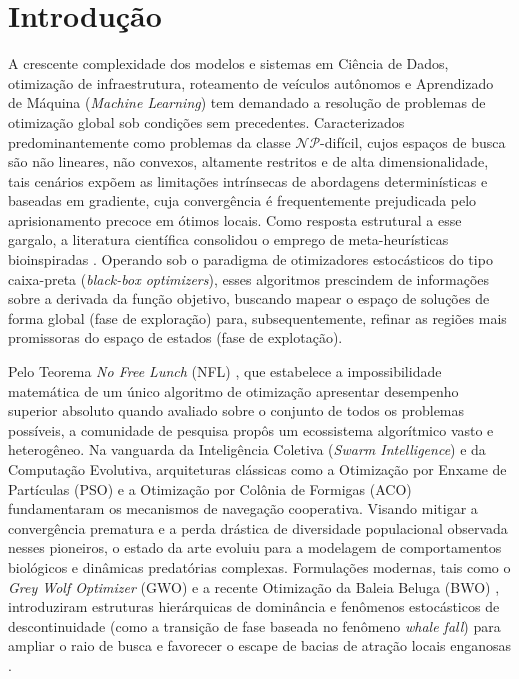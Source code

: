 \documentclass[12pt, a4paper, oneside]{report}
\begin{document}
\tableofcontents
\clearpage


\chapter{Introdução}
A crescente complexidade dos modelos e sistemas em Ciência de Dados, otimização de infraestrutura, roteamento de veículos autônomos e Aprendizado de Máquina (\textit{Machine Learning}) tem demandado a resolução de problemas de otimização global sob condições sem precedentes. Caracterizados predominantemente como problemas da classe $\mathcal{NP}$-difícil, cujos espaços de busca são não lineares, não convexos, altamente restritos e de alta dimensionalidade, tais cenários expõem as limitações intrínsecas de abordagens determinísticas e baseadas em gradiente, cuja convergência é frequentemente prejudicada pelo aprisionamento precoce em ótimos locais. Como resposta estrutural a esse gargalo, a literatura científica consolidou o emprego de meta-heurísticas bioinspiradas \citep{jamali2025systematic, somvanshi2025review}. Operando sob o paradigma de otimizadores estocásticos do tipo caixa-preta (\textit{black-box optimizers}), esses algoritmos prescindem de informações sobre a derivada da função objetivo, buscando mapear o espaço de soluções de forma global (fase de exploração) para, subsequentemente, refinar as regiões mais promissoras do espaço de estados (fase de explotação).

Pelo Teorema \textit{No Free Lunch} (NFL) \citep{wolpert1997no}, que estabelece a impossibilidade matemática de um único algoritmo de otimização apresentar desempenho superior absoluto quando avaliado sobre o conjunto de todos os problemas possíveis, a comunidade de pesquisa propôs um ecossistema algorítmico vasto e heterogêneo. Na vanguarda da Inteligência Coletiva (\textit{Swarm Intelligence}) e da Computação Evolutiva, arquiteturas clássicas como a Otimização por Enxame de Partículas (PSO) e a Otimização por Colônia de Formigas (ACO) fundamentaram os mecanismos de navegação cooperativa. Visando mitigar a convergência prematura e a perda drástica de diversidade populacional observada nesses pioneiros, o estado da arte evoluiu para a modelagem de comportamentos biológicos e dinâmicas predatórias complexas. Formulações modernas, tais como o \textit{Grey Wolf Optimizer} (GWO) \citep{mirjalili2014grey} e a recente Otimização da Baleia Beluga (BWO) \citep{zhong2022beluga}, introduziram estruturas hierárquicas de dominância e fenômenos estocásticos de descontinuidade (como a transição de fase baseada no fenômeno \textit{whale fall}) para ampliar o raio de busca e favorecer o escape de bacias de atração locais enganosas \citep{wen2025enhanced}.
\end{document}
